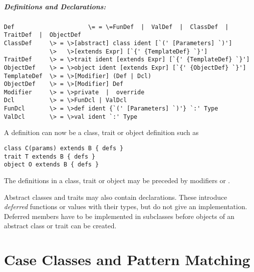\documentclass[11pt]{book}
\begin{document}
\paragraph{Definitions and Declarations:}
\begin{verbatim}
Def                     \= = \=FunDef  |  ValDef  |  ClassDef  |  TraitDef  |  ObjectDef
ClassDef     \> = \>[abstract] class ident [`(' [Parameters] `)'] 
             \>   \>[extends Expr] [`{' {TemplateDef} `}']
TraitDef     \> = \>trait ident [extends Expr] [`{' {TemplateDef} `}']
ObjectDef    \> = \>object ident [extends Expr] [`{' {ObjectDef} `}']
TemplateDef  \> = \>[Modifier] (Def | Dcl)
ObjectDef    \> = \>[Modifier] Def
Modifier     \> = \>private  |  override
Dcl          \> = \>FunDcl | ValDcl
FunDcl       \> = \>def ident {`(' [Parameters] `)'} `:' Type
ValDcl       \> = \>val ident `:' Type
\end{verbatim}

A definition can now be a class, trait or object definition such as
\begin{verbatim}
class C(params) extends B { defs }
trait T extends B { defs }
object O extends B { defs }
\end{verbatim}
The definitions \verb@defs@ in a class, trait or object may be
preceded by modifiers \verb@private@ or \verb@override@.

Abstract classes and traits may also contain declarations. These
introduce {\em deferred} functions or values with their types, but do
not give an implementation. Deferred members have to be implemented in
subclasses before objects of an abstract class or trait can be created.

\chapter{Case Classes and Pattern Matching}
\end{document}
